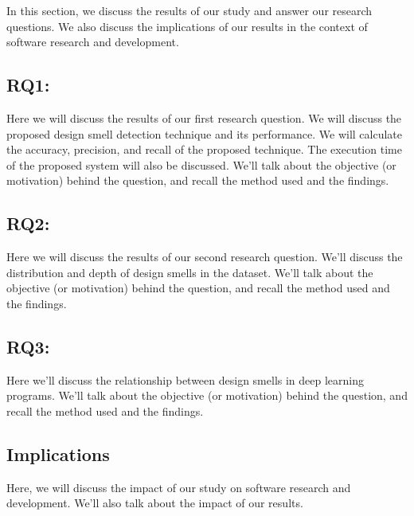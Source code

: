 \label{sec:discussion}
In this section, we discuss the results of our study and answer our research questions. We also discuss the implications of our results in the context of software research and development.
\emph{}

\subsection{RQ1:\RQOne}
\label{rq1}

Here we will discuss the results of our first research question. We will discuss
the proposed design smell detection technique and its performance. We will
calculate the accuracy, precision, and recall of the proposed technique. The
execution time of the proposed system will also be discussed. We'll talk about
the objective (or motivation) behind the question, and recall the method used and the findings.





\subsection{RQ2:\RQTwo}
\label{rq2}

Here we will discuss the results of our second research question. We'll discuss the distribution and depth of design smells in the dataset. We'll talk about the objective (or motivation) behind the question, and recall the method used and the findings.



\subsection{RQ3:\RQThree}
\label{rq3}

Here we'll discuss the relationship between design smells in deep learning programs. We'll talk about the objective (or motivation) behind the question, and recall the method used and the findings.






\subsection{Implications}
\label{implications}
Here, we will discuss the impact of our study on software research and development. We'll also talk about the impact of our results.




